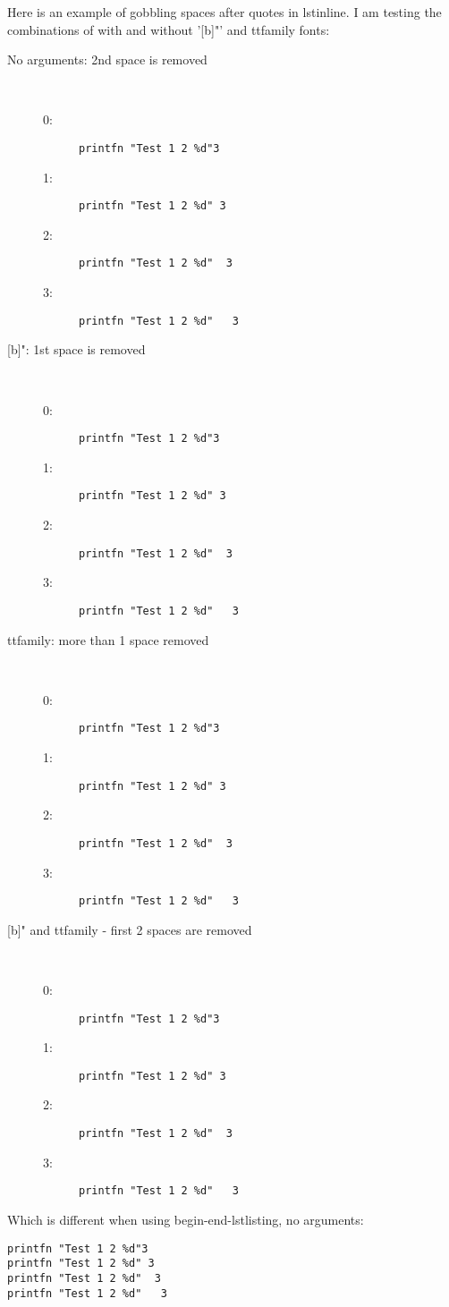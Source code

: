 \documentclass{article}
\begin{document}
\noindent Here is an example of gobbling spaces after quotes in lstinline. I am testing the combinations of with and without '[b]"' and ttfamily fonts:

\begin{description}
\item[No arguments: 2nd space is removed]~\\
  \begin{description}
  \item[0:] \lstinline!printfn "Test 1 2 %d"3!
  \item[1:] \lstinline!printfn "Test 1 2 %d" 3!
  \item[2:] \lstinline!printfn "Test 1 2 %d"  3!
  \item[3:] \lstinline!printfn "Test 1 2 %d"   3!
  \end{description}
\item[{[b]"}: 1st space is removed]~\\
  \begin{description}
  \item[0:] \lstinline[morestring={[b]"}]!printfn "Test 1 2 %
  \item[1:] \lstinline[morestring={[b]"}]!printfn "Test 1 2 %
  \item[2:] \lstinline[morestring={[b]"}]!printfn "Test 1 2 %
  \item[3:] \lstinline[morestring={[b]"}]!printfn "Test 1 2 %
  \end{description}
\item[ttfamily: more than 1 space removed]~\\
   \begin{description}
  \item[0:] \lstinline[basicstyle=\ttfamily]!printfn "Test 1 2 %d"3!
  \item[1:] \lstinline[basicstyle=\ttfamily]!printfn "Test 1 2 %d" 3!
  \item[2:] \lstinline[basicstyle=\ttfamily]!printfn "Test 1 2 %d"  3!
  \item[3:] \lstinline[basicstyle=\ttfamily]!printfn "Test 1 2 %d"   3!
  \end{description}
\item[{[b]"} and ttfamily - first 2 spaces are removed]~\\
   \begin{description}
  \item[0:] \lstinline[morestring={[b]"},basicstyle=\ttfamily]!printfn "Test 1 2 %
  \item[1:] \lstinline[morestring={[b]"},basicstyle=\ttfamily]!printfn "Test 1 2 %
  \item[2:] \lstinline[morestring={[b]"},basicstyle=\ttfamily]!printfn "Test 1 2 %
  \item[3:] \lstinline[morestring={[b]"},basicstyle=\ttfamily]!printfn "Test 1 2 %
  \end{description}
\end{description}
Which is different when using begin-end-lstlisting, no arguments:
\begin{lstlisting}
printfn "Test 1 2 %d"3
printfn "Test 1 2 %d" 3
printfn "Test 1 2 %d"  3 
printfn "Test 1 2 %d"   3 
\end{lstlisting}
\end{document}
